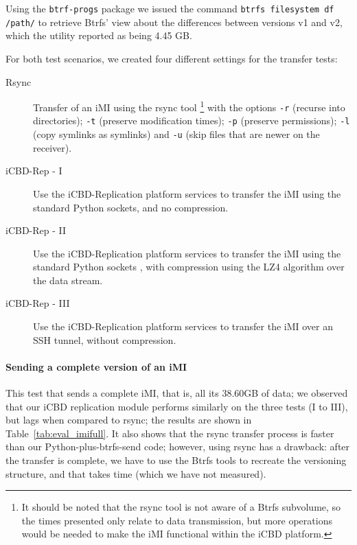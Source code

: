 Using the \texttt{btrf-progs} package we issued the command \texttt{btrfs filesystem df /path/} to retrieve Btrfs’ view about the differences between versions v1 and v2, which the utility reported as being 4.45 GB.


For both test scenarios, we created four different settings for the transfer tests:

\begin{description}
	\item [Rsync] Transfer of an iMI using the rsync tool \footnote{It should be noted that the rsync tool is not aware of a Btrfs subvolume, so the times presented only relate to data transmission, but more operations would be needed to make the iMI functional within the iCBD platform.} with the options \texttt{-r} (recurse into directories); \texttt{-t} (preserve modification times); \texttt{-p} (preserve permissions); \texttt{-l} (copy symlinks as symlinks) and \texttt{-u} (skip files that are newer on the receiver).
	\item [iCBD-Rep - I] Use the iCBD-Replication platform services to transfer the iMI using the standard Python sockets, and no compression.
	\item [iCBD-Rep - II] Use the iCBD-Replication platform services to transfer the iMI using the standard Python sockets , with compression using the LZ4 algorithm over the data stream.
	\item [iCBD-Rep - III] Use the iCBD-Replication platform services to transfer the iMI over an SSH tunnel, without compression.
\end{description}


\paragraph{Sending a complete version of an iMI}
\label{par:eval_iMI_full}

This test that sends a complete iMI, that is, all its 38.60GB of data; we observed that our iCBD replication module performs similarly on the three tests (I to III), but lags when compared to rsync; the results are shown in Table~\ref{tab:eval_imifull}.
It also shows that the rsync transfer process is faster than our Python-plus-btrfs-send code; however, using rsync has a drawback: after the transfer is complete, we have to use the Btrfs tools to recreate the versioning structure, and that takes time (which we have not measured).

